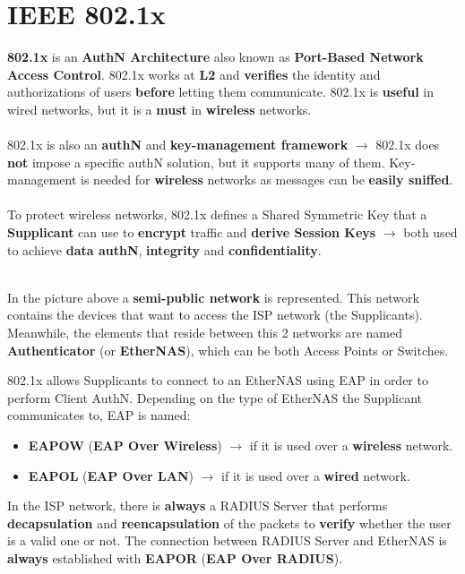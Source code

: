 \section{IEEE 802.1x}
\textbf{802.1x} is an \textbf{AuthN Architecture} also known as \textbf{Port-Based Network Access Control}.
802.1x works at \textbf{L2} and \textbf{verifies} the identity and authorizations of users \textbf{before} letting them
communicate. 802.1x is \textbf{useful} in wired networks, but it is a \textbf{must} in \textbf{wireless} networks.\\    
\\    
802.1x is also an \textbf{authN} and \textbf{key-management framework} \(\rightarrow \) 802.1x does \textbf{not} impose a
specific authN solution, but it supports many of them. Key-management is needed for \textbf{wireless} networks as messages can be \textbf{easily sniffed}.\\    
\\ 
To protect wireless networks, 802.1x defines a Shared Symmetric Key that a \textbf{Supplicant} can use to \textbf{encrypt} traffic and \textbf{derive Session Keys} \(\rightarrow \) both used to achieve \textbf{data authN}, \textbf{integrity} and \textbf{confidentiality}.
\\ 
\\
\begin{minipage}{0.6\textwidth}
In the picture above a \textbf{semi-public network} is represented. This network contains the devices that want to access the ISP network (the Supplicants). Meanwhile, the elements that reside
between this 2 networks are named \textbf{Authenticator} (or \textbf{EtherNAS}), which can be both Access Points or Switches.

802.1x allows Supplicants to connect to an EtherNAS using EAP in order to perform Client
AuthN. Depending on the type of EtherNAS the Supplicant communicates to, EAP is named:
\begin{itemize}
    \item \textbf{EAPOW} (\textbf{EAP Over Wireless}) \(\rightarrow \) if it is used over a \textbf{wireless} network.
    \item \textbf{EAPOL} (\textbf{EAP Over LAN}) \(\rightarrow \) if it is used over a \textbf{wired} network.
\end{itemize}
In the ISP network, there is \textbf{always} a RADIUS Server that performs \textbf{decapsulation} and \textbf{reencapsulation} of the packets to \textbf{verify} whether the user is a valid one or not. The connection between RADIUS Server and EtherNAS is \textbf{always} established with \textbf{EAPOR} (\textbf{EAP Over RADIUS}).
\end{minipage} 
